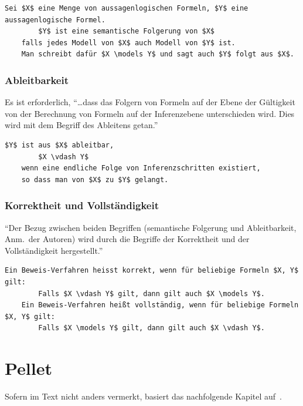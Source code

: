 \begin{lstlisting}[caption={Definition semantische Folgerung\protect\footnotemark}]
    Sei $X$ eine Menge von aussagenlogischen Formeln, $Y$ eine aussagenlogische Formel.
        $Y$ ist eine semantische Folgerung von $X$
    falls jedes Modell von $X$ auch Modell von $Y$ ist.
    Man schreibt dafür $X \models Y$ und sagt auch $Y$ folgt aus $X$.
\end{lstlisting}

\subsubsection{Ableitbarkeit}
\label{subsubsection:beschreibungslogik_ableitbarkeit}
Es ist erforderlich, ``\dots dass das Folgern von Formeln auf der Ebene der Gültigkeit von der Berechnung von Formeln auf der Inferenzebene unterschieden wird. Dies wird mit dem Begriff des Ableitens getan.''~\cite[S. 42]{laemmel}

\begin{lstlisting}[caption={Definition Ableitbarkeit\protect\footnotemark}]
    $Y$ ist aus $X$ ableitbar,
        $X \vdash Y$
    wenn eine endliche Folge von Inferenzschritten existiert,
    so dass man von $X$ zu $Y$ gelangt.
\end{lstlisting}

\subsubsection{Korrektheit und Vollständigkeit}
\label{subsubsection:beschreibungslogik_vollstanendigkeit}
``Der Bezug zwischen beiden Begriffen (semantische Folgerung und Ableitbarkeit, Anm.\ der Autoren) wird durch die Begriffe der Korrektheit und der Vollständigkeit hergestellt.''~\cite[S. 43]{laemmel}

\begin{lstlisting}[caption={Definition Korrektheit und Vollständigkeit\protect\footnotemark}]
    Ein Beweis-Verfahren heisst korrekt, wenn für beliebige Formeln $X, Y$ gilt:
        Falls $X \vdash Y$ gilt, dann gilt auch $X \models Y$.
    Ein Beweis-Verfahren heißt vollständig, wenn für beliebige Formeln $X, Y$ gilt:
        Falls $X \models Y$ gilt, dann gilt auch $X \vdash Y$.
\end{lstlisting}

\section{Pellet}
\label{sec:inferenz_pellet}
Sofern im Text nicht anders vermerkt, basiert das nachfolgende Kapitel auf~\cite{sirin:pellet05}.

